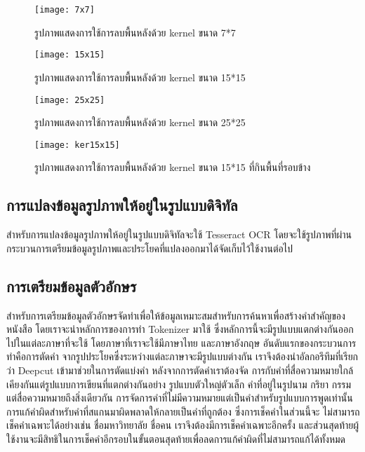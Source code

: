 \begin{figure}[H]
    \centering
    \texttt{[image: 7x7]}
    \caption{รูปภาพแสดงการใช้การลบพื้นหลังด้วย kernel ขนาด 7*7}\label{fig:7x7}
\end{figure}

\begin{figure}[H]
    \centering
    \texttt{[image: 15x15]}
    \caption{รูปภาพแสดงการใช้การลบพื้นหลังด้วย kernel ขนาด 15*15}\label{fig:15x15}
\end{figure}

\begin{figure}[H]
    \centering
    \texttt{[image: 25x25]}
    \caption{รูปภาพแสดงการใช้การลบพื้นหลังด้วย kernel ขนาด 25*25}\label{fig:25x25}
\end{figure}

\begin{figure}[H]
    \centering
    \texttt{[image: ker15x15]}
    \caption{รูปภาพแสดงการใช้การลบพื้นหลังด้วย kernel ขนาด 15*15 ที่กินพื้นที่รอบข้าง}\label{fig:ker15x15}
\end{figure}

\subsection{การแปลงข้อมูลรูปภาพให้อยู่ในรูปแบบดิจิทัล}

สำหรับการแปลงข้อมูลรูปภาพให้อยู่ในรูปแบบดิจิทัลจะใช้ Tesseract OCR โดยจะใช้รูปภาพที่ผ่านกระบวนการเตรียมข้อมูลรูปภาพและประโยคที่แปลงออกมาได้จัดเก็บไว้ใช้งานต่อไป

\subsection{การเตรียมข้อมูลตัวอักษร}

สำหรับการเตรียมข้อมูลตัวอักษรจัดทำเพื่อให้ข้อมูลเหมาะสมสำหรับการค้นหาเพื่อสร้างคำสำคัญของหนังสือ โดยเราจะนำหลักการของการทำ Tokenizer มาใช้ 
ซึ่งหลักการนี้จะมีรูปแบบแตกต่างกันออกไปในแต่ละภาษาที่จะใช้ โดยภาษาที่เราจะใช้มีภาษาไทย และภาษาอังกฤษ อันดับแรกของกระบวนการทำคือการตัดคำ
จากรูปประโยคซึ่งระหว่างแต่ละภาษาจะมีรูปแบบต่างกัน เราจึงต้องนำอัลกอรึทึมที่เรียกว่า Deepcut เข้ามาช่วยในการตัดแบ่งคำ หลังจากการตัดคำเราต้องจัด
การกับคำที่สื่อความหมายใกล้เคียงกันแต่รูปแบบการเขียนที่แตกต่างกันอย่าง รูปแบบตัวใหญ่ตัวเล็ก คำที่อยู่ในรูปนาม กริยา กรรมแต่สื่อความหมายถึงสิ่งเดียวกัน 
การจัดการคำที่ไม่มีความหมายแต่เป็นคำสำหรับรูปแบบการพูดเท่านั้น การแก้คำผิดสำหรับคำที่สแกนมาผิดพลาดให้กลายเป็นคำที่ถูกต้อง ซึ่งการเช็คคำในส่วนนี้จะ
ไม่สามารถเช็คคำเฉพาะได้อย่างเช่น ชื่อมหาวิทยาลัย ชื่อคน เราจึงต้องมีการเช็คคำเฉพาะอีกครั้ง และส่วนสุดท้ายผู้ใช้งานจะมีสิทธิในการเช็คคำอีกรอบในขั้นตอนสุดท้ายเพื่อลดการแก้คำผิดที่ไม่สามารถแก้ได้ทั้งหมด

